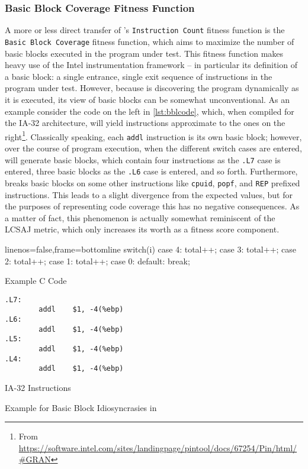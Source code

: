 \subsubsection{Basic Block Coverage Fitness Function}
A more or less direct transfer of \evosuite's \texttt{Instruction Count} fitness function is the 
\texttt{Basic Block Coverage} fitness function, which aims to maximize the number of basic blocks 
executed in the program under test. This fitness function makes heavy use of the Intel \pin
instrumentation framework -- in particular its definition of a basic block: a single entrance, 
single exit sequence of instructions in the program under test. However, because \pin is discovering the 
program dynamically as it is executed, its view of basic blocks can be somewhat unconventional. As an 
example consider the code on the left in \cref{lst:bblcode}, which, when compiled for the IA-32 
architecture, will yield instructions approximate to the ones on the 
right\footnote{From \url{https://software.intel.com/sites/landingpage/pintool/docs/67254/Pin/html/\#GRAN}}.
Classically speaking, each \texttt{addl} instruction is its own basic block; however, over the course
of program execution, when the different switch cases are entered, \pin will generate basic blocks, which
contain four instructions as the \texttt{.L7} case is entered, three basic blocks as the \texttt{.L6}
case is entered, and so forth. Furthermore, \pin breaks basic blocks on some other instructions like 
\texttt{cpuid}, \texttt{popf}, and \texttt{REP} prefixed instructions. This leads to a slight divergence 
from the expected values, but for the purposes of representing code coverage this has no negative 
consequences. As a matter of fact, this phenomenon is actually somewhat reminiscent of the LCSAJ
metric\cite{Hennell:1976:PA}, which only increases its worth as a fitness score component.
\begin{listing}[h]
\centering
\begin{minipage}[b]{0.49\textwidth}
	\centering
	\begin{ccode*}{linenos=false,frame=bottomline}
	switch(i) {
        case 4: total++;
        case 3: total++;
        case 2: total++;
        case 1: total++;
        case 0:
        default: break;
    	}
\end{ccode*}
	Example C Code
 \end{minipage}
%
 \begin{minipage}[b]{0.49\textwidth}
  \centering
  \begin{verbatim}
.L7:
        addl    $1, -4(%ebp)
.L6:
        addl    $1, -4(%ebp)
.L5:
        addl    $1, -4(%ebp)
.L4:
        addl    $1, -4(%ebp)
\end{verbatim}
  IA-32 Instructions
 \end{minipage}
 \caption{Example for Basic Block Idiosyncrasies in \pin}
 \label{lst:bblcode}
\end{listing}


